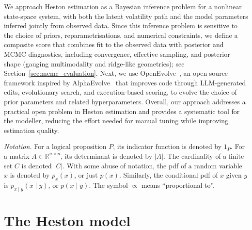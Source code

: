 \documentclass[11pt]{report}
\newcommand{\R}{\mathbb{R}}
\begin{document}
We approach Heston estimation as a Bayesian inference problem
for a nonlinear state-space system, with both the latent volatility
path and the model parameters inferred jointly from observed data.
Since this inference problem is sensitive to the choice of priors,
reparametrisations, and numerical constraints, we define a composite
score that combines fit to the observed data with posterior and MCMC
diagnostics, including convergence, effective sampling, and posterior
shape (gauging multimodality and ridge-like geometries);
see Section~\ref{sec:mcmc_evaluation}. 
Next, we use OpenEvolve~\cite{openevolve}, an open-source framework 
inspired by AlphaEvolve~\cite{AlphaEvolve2025} that improves code through
LLM-generated edits, evolutionary search, and execution-based scoring,
to evolve the choice of prior parameters and related hyperparameters. 
Overall, our approach addresses a practical open problem in
Heston estimation and provides a systematic tool for the modeller,
reducing the effort needed for manual tuning
while improving estimation quality.

\textit{Notation.} 
For a logical proposition $P$, its indicator function 
is denoted by $1_P$. For a matrix $A\in\R^{n\times n}$, 
its determinant is denoted by $|A|$. The cardinality of a 
finite set $C$ is denoted $|C|$. With some abuse of notation,
the pdf of a random variable $x$ is denoted by $p_x(x)$, or 
just $p(x)$. Similarly, the conditional pdf of $x$ given $y$ 
is $p_{x {}\mid{} y}(x {}\mid{} y)$, or $p(x {}\mid{} y)$.
The symbol $\propto$ means ``proportional to''.

\section{The Heston model}\label{sec:methodology}
\end{document}
